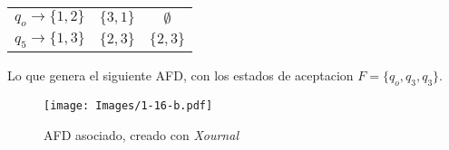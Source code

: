 \begin{mdframed}[style = warning]
\begin{problem}
\begin{enumerate}[a)]
\begin{table}[H]
\begin{tabular}{c|cc}
						$q_o \to \{ 1,2 \}$ & $\{ 3,1 \}$ & $\emptyset$ \\
						$q_5 \to \{ 1,3 \}$ & $\{ 2,3 \}$ & $\{ 2,3 \}$ 
					\end{tabular}
				\end{table}
			Lo que genera el siguiente AFD, con los estados de aceptacion $F = \{ q_o,q_3,q_3 \}$.
				\begin{figure}[H]
					\centering
					\texttt{[image: Images/1-16-b.pdf]}
					\caption{AFD asociado, creado con \textit{Xournal}}
					\label{16-b}
				\end{figure}
		\end{enumerate}
	\end{problem}
\end{mdframed}












